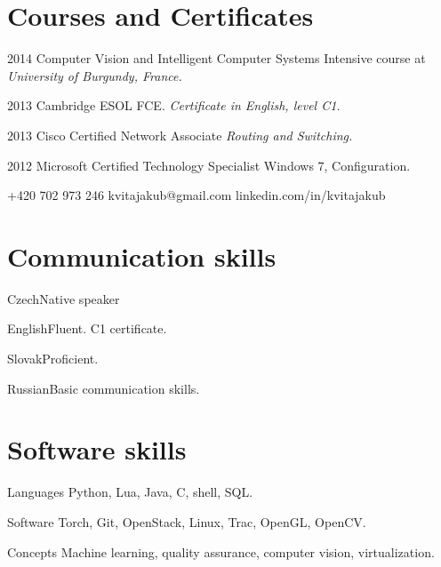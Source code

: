 \documentclass{tccv}
\begin{document}
\section{Courses and Certificates}

\begin{yearlist}
	
	\item{2014}
	{Computer Vision and Intelligent Computer Systems}
	{Intensive course at \emph{University of Burgundy, France.}}
	
	\item{2013}
	{Cambridge ESOL FCE.}
	{\emph{Certificate in English, level C1.}}
	
	\item{2013}
	{Cisco Certified Network Associate}
	{\emph{Routing and Switching.}}
	
	\item{2012}
	{Microsoft Certified Technology Specialist}
	{Windows 7, Configuration.}
	
\end{yearlist}

{+420 702 973 246}
{kvitajakub@gmail.com}
{linkedin.com/in/kvitajakub}

\section{Communication skills}

\begin{factlist}
\item{Czech}{Native speaker}
\item{English}{Fluent. C1 certificate.}
\item{Slovak}{Proficient.}
\item{Russian}{Basic communication skills.}
\end{factlist}

\section{Software skills}

\begin{factlist}

\item{Languages}
     {Python, Lua, Java, C, shell, SQL.}

\item{Software}
     {Torch, Git, OpenStack, Linux, Trac, OpenGL, OpenCV.}

\item{Concepts}
     {Machine learning, quality assurance, computer vision, virtualization.}

\end{factlist}
\end{document}
